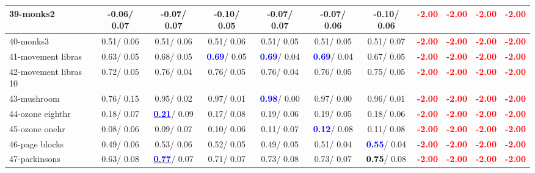 \begin{table}[h]
\begin{center}
{\begin{tabular}{lc|c|c|c|c|c|c|c|c|c}
39-monks2 &  -0.06/  0.07 &  -0.07/  0.07 &  -0.10/  0.05 &  -0.07/  0.07 &  -0.07/  0.06 &  -0.10/  0.06 & \textcolor{red}{\textbf{ -2.00}} & \textcolor{red}{\textbf{ -2.00}} & \textcolor{red}{\textbf{ -2.00}} & \textcolor{red}{\textbf{ -2.00}} \\ \hline
40-monks3 &   0.51/  0.06 &   0.51/  0.06 &   0.51/  0.06 &   0.51/  0.05 &   0.51/  0.05 &   0.51/  0.07 & \textcolor{red}{\textbf{ -2.00}} & \textcolor{red}{\textbf{ -2.00}} & \textcolor{red}{\textbf{ -2.00}} & \textcolor{red}{\textbf{ -2.00}} \\
41-movement libras &   0.63/  0.05 &   0.68/  0.05 & \textcolor{blue}{\textbf{  0.69}}/  0.05 & \textcolor{blue}{\textbf{  0.69}}/  0.04 & \textcolor{blue}{\textbf{  0.69}}/  0.04 &   0.67/  0.05 & \textcolor{red}{\textbf{ -2.00}} & \textcolor{red}{\textbf{ -2.00}} & \textcolor{red}{\textbf{ -2.00}} & \textcolor{red}{\textbf{ -2.00}} \\
42-movement libras 10 &   0.72/  0.05 &   0.76/  0.04 &   0.76/  0.05 &   0.76/  0.04 &   0.76/  0.05 &   0.75/  0.05 & \textcolor{red}{\textbf{ -2.00}} & \textcolor{red}{\textbf{ -2.00}} & \textcolor{red}{\textbf{ -2.00}} & \textcolor{red}{\textbf{ -2.00}} \\
43-mushroom &   0.76/  0.15 &   0.95/  0.02 &   0.97/  0.01 & \textcolor{blue}{\textbf{  0.98}}/  0.00 &   0.97/  0.00 &   0.96/  0.01 & \textcolor{red}{\textbf{ -2.00}} & \textcolor{red}{\textbf{ -2.00}} & \textcolor{red}{\textbf{ -2.00}} & \textcolor{red}{\textbf{ -2.00}} \\
44-ozone eighthr &   0.18/  0.07 & \underline{\textcolor{blue}{\textbf{  0.21}}}/  0.09 &   0.17/  0.08 &   0.19/  0.06 &   0.19/  0.05 &   0.18/  0.06 & \textcolor{red}{\textbf{ -2.00}} & \textcolor{red}{\textbf{ -2.00}} & \textcolor{red}{\textbf{ -2.00}} & \textcolor{red}{\textbf{ -2.00}} \\
45-ozone onehr &   0.08/  0.06 &   0.09/  0.07 &   0.10/  0.06 &   0.11/  0.07 & \textcolor{blue}{\textbf{  0.12}}/  0.08 &   0.11/  0.08 & \textcolor{red}{\textbf{ -2.00}} & \textcolor{red}{\textbf{ -2.00}} & \textcolor{red}{\textbf{ -2.00}} & \textcolor{red}{\textbf{ -2.00}} \\
46-page blocks &   0.49/  0.06 &   0.53/  0.06 &   0.52/  0.05 &   0.49/  0.05 &   0.51/  0.04 & \textcolor{blue}{\textbf{  0.55}}/  0.04 & \textcolor{red}{\textbf{ -2.00}} & \textcolor{red}{\textbf{ -2.00}} & \textcolor{red}{\textbf{ -2.00}} & \textcolor{red}{\textbf{ -2.00}} \\ \hline
47-parkinsons &   0.63/  0.08 & \underline{\textcolor{blue}{\textbf{  0.77}}}/  0.07 &   0.71/  0.07 &   0.73/  0.08 &   0.73/  0.07 & \textcolor{black}{\textbf{  0.75}}/  0.08 & \textcolor{red}{\textbf{ -2.00}} & \textcolor{red}{\textbf{ -2.00}} & \textcolor{red}{\textbf{ -2.00}} & \textcolor{red}{\textbf{ -2.00}} \\

\end{tabular}}
\end{center}
\end{table}

